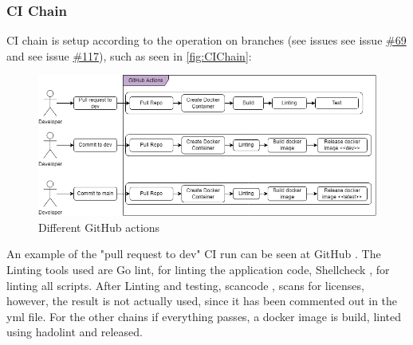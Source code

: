 \subsubsection{CI Chain}
CI chain is setup according to the operation on branches (see issues see issue \href{https://github.com/DevelOpsITU/MiniTwit/issues/69}{\#69} and see issue \href{https://github.com/DevelOpsITU/MiniTwit/issues/117}{\#117}), such as seen in \autoref{fig:CIChain}: 
\begin{figure}[H]
    \centering
    \includegraphics[width=\linewidth]{images/diagrams/CI_Chain.png}
    \caption{Different GitHub actions}
    \label{fig:CIChain}
\end{figure}
%    
%    

An example of the "pull request to dev" CI run can be seen at GitHub \cite{ci_run_example_1}.
The Linting tools used are Go lint\cite{golinter.sh}, for linting the application code, Shellcheck \cite{shellchecker.sh}, for linting all scripts. After Linting and testing, scancode \cite{scancode_dockerfile}, scans for licenses, however, the result is not actually used, since it has been commented out in the yml file\cite{pullreq_to_dev_yml}. For the other chains if everything passes, a docker image is build, linted using hadolint\cite{hadolint} and released. \\

